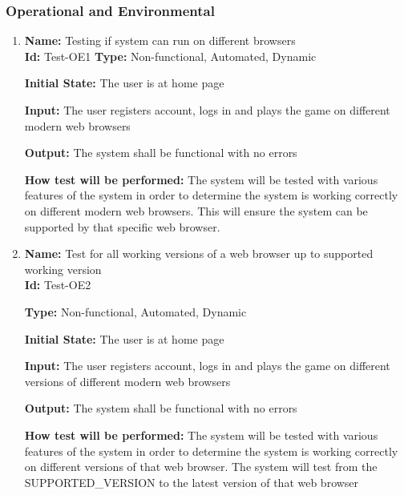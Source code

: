 \documentclass[12pt, titlepage]{article}
\begin{document}
\subsubsection{Operational and Environmental}
\begin{enumerate}
    \item{\textbf{Name: }Testing if system can run on different browsers\\} \label{Test-OE1}
    \textbf{Id: }Test-OE1
   \textbf{ Type:} Non-functional, Automated, Dynamic
    					
    \textbf{Initial State:} The user is at home page
    					
   \textbf{Input:} The user registers account, logs in and plays the game on different modern web browsers
    					
   \textbf{Output: }The system shall be functional with no errors
    					
   \textbf{How test will be performed: }The system will be tested with various features of the system in order to determine the system is working correctly on different modern web browsers. This will ensure the system can be supported by that specific web browser.
    
    \item{\textbf{Name: }Test for all working versions of a web browser up to supported working version \\} \label{Test-OE2}
    \textbf{Id: }Test-OE2
    
    \textbf{Type:} Non-functional, Automated, Dynamic
    					
    \textbf{Initial State: }The user is at home page
    					
   \textbf{Input:} The user registers account, logs in and plays the game on different versions of different modern web browsers
    					
    \textbf{Output:} The system shall be functional with no errors
    					
    \textbf{How test will be performed:} The system will be tested with various features of the system in order to determine the system is working correctly on different versions of that web browser. The system will test from the SUPPORTED\_VERSION to the latest version of that web browser
\end{enumerate}
\end{document}
